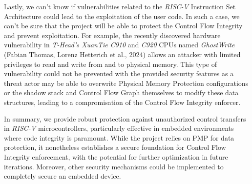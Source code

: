 Lastly, we can't know if vulnerabilities related to the \textit{RISC-V} Instruction
Set Architecture could lead to the exploitation of the user code. In such a case,
we can't be sure that the project will be able to protect the Control Flow Integrity
and prevent exploitation. For example, the recently discovered hardware vulnerability
in \textit{T-Head's XuanTie C910} and \textit{C920} CPUs named \textit{GhostWrite}
(Fabian Thomas, Lorenz Hetterich et al., 2024)\cite{riscvuzz} allows an attacker
with limited privileges to read and write from and to physical memory. This type
of vulnerability could not be prevented with the provided security features as a
threat actor may be able to overwrite Physical Memory Protection configurations or
the shadow stack and Control Flow Graph themselves to modify these data structures,
leading to a compromisation of the Control Flow Integrity enforcer.

In summary, we provide robust protection against unauthorized control transfers in
\textit{RISC-V} microcontrollers, particularly effective in embedded environments
where code integrity is paramount. While the project relies on PMP for data
protection, it nonetheless establishes a secure foundation for Control Flow Integrity
enforcement, with the potential for further optimization in future iterations. Moreover,
other security mechanisms could be implemented to completely secure an embedded
device.

